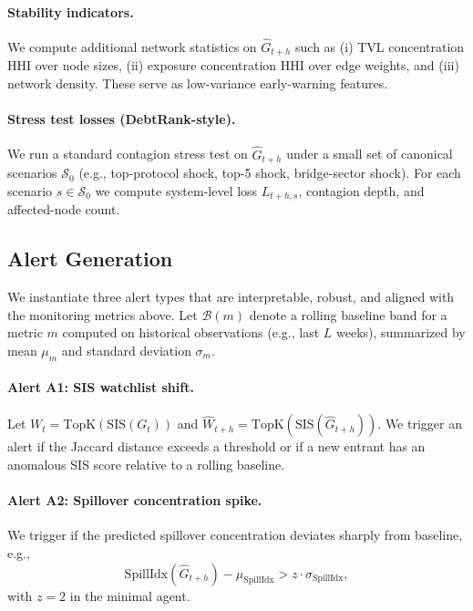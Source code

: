 \paragraph{Stability indicators.}
We compute additional network statistics on $\widehat{G}_{t+h}$ such as (i) TVL concentration $\mathrm{HHI}$ over node sizes, (ii) exposure concentration $\mathrm{HHI}$ over edge weights, and (iii) network density. These serve as low-variance early-warning features.

\paragraph{Stress test losses (DebtRank-style).}
We run a standard contagion stress test on $\widehat{G}_{t+h}$ under a small set of canonical scenarios $\mathcal{S}_0$ (e.g., top-protocol shock, top-5 shock, bridge-sector shock). For each scenario $s\in\mathcal{S}_0$ we compute system-level loss $L_{t+h,s}$, contagion depth, and affected-node count.

\subsection{Alert Generation}
\label{sec:alerts}
We instantiate three alert types that are interpretable, robust, and aligned with the monitoring metrics above. Let $\mathcal{B}(m)$ denote a rolling baseline band for a metric $m$ computed on historical observations (e.g., last $L$ weeks), summarized by mean $\mu_m$ and standard deviation $\sigma_m$.

\paragraph{Alert A1: SIS watchlist shift.}
Let $W_t=\mathrm{TopK}(\mathrm{SIS}(G_t))$ and $\widehat{W}_{t+h}=\mathrm{TopK}(\mathrm{SIS}(\widehat{G}_{t+h}))$. We trigger an alert if the Jaccard distance exceeds a threshold or if a new entrant has an anomalous SIS score relative to a rolling baseline.

\paragraph{Alert A2: Spillover concentration spike.}
We trigger if the predicted spillover concentration deviates sharply from baseline, e.g.,
\begin{equation}
\label{eq:spill_alert}
\mathrm{SpillIdx}(\widehat{G}_{t+h}) - \mu_{\mathrm{SpillIdx}} > z\cdot \sigma_{\mathrm{SpillIdx}},
\end{equation}
with $z=2$ in the minimal agent.


